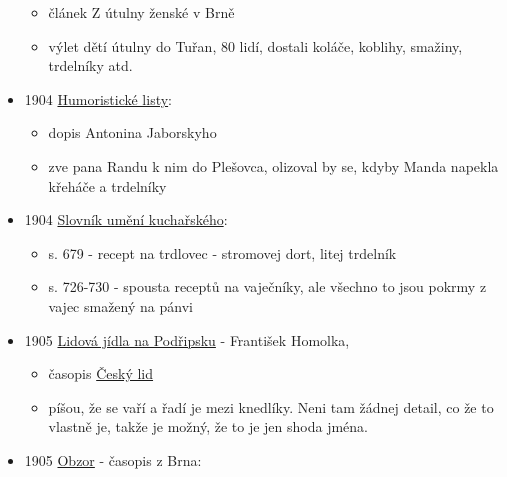 \begin{itemize}
  \begin{itemize}
  \tightlist
  \item
    článek Z útulny ženské v Brně
  \item
    výlet dětí útulny do Tuřan, 80 lidí, dostali koláče, koblihy,
    smažiny, trdelníky atd.
  \end{itemize}
\item
  1904
  \href{https://ceskadigitalniknihovna.cz/uuid/uuid:e6cbfaf4-435d-11dd-b505-00145e5790ea}{Humoristické
  listy}:

  \begin{itemize}
  \tightlist
  \item
    dopis Antonina Jaborskyho
  \item
    zve pana Randu k nim do Plešovca, olizoval by se, kdyby Manda
    napekla křeháče a trdelníky
  \end{itemize}
\item
  1904
  \href{https://ceskadigitalniknihovna.cz/view/uuid:245714d0-e323-11ec-a26a-5ef3fc9bb22f?page=uuid\%3Acacf7f15-f1a5-4cca-a344-05b1ee66b972&fulltext=trdlovec&source=nkp}{Slovník
  umění kuchařského}:

  \begin{itemize}
  \tightlist
  \item
    s. 679 - recept na trdlovec - stromovej dort, litej trdelník
  \item
    s. 726-730 - spousta receptů na vaječníky, ale všechno to jsou
    pokrmy z vajec smažený na pánvi
  \end{itemize}
\item
  1905 \href{https://www.jstor.org/stable/42693111}{Lidová jídla na
  Podřipsku} - František Homolka,

  \begin{itemize}
  \tightlist
  \item
    časopis
    \href{https://ceskadigitalniknihovna.cz/uuid/uuid:27984073-3c0d-48de-8c3a-9b56c8b34d7a}{Český
    lid}
  \item
    píšou, že se vaří a řadí je mezi knedlíky. Neni tam žádnej detail,
    co že to vlastně je, takže je možný, že to je jen shoda jména.
  \end{itemize}
\item
  1905
  \href{https://ceskadigitalniknihovna.cz/view/uuid:89c00f20-ac41-11dd-b6fd-000d606f5dc6?page=uuid\%3A2b67a058-6dd3-4a26-8b98-58bc2dd95f6a&fulltext=trdeln\%C3\%ADk\%20OR\%20trdeln\%C3\%ADky\%20OR\%20trdeln\%C3\%ADk\%C5\%AF&source=nkp}{Obzor}
  - časopis z Brna:


\end{itemize}
